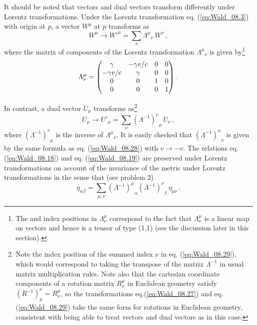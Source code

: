 It should be noted that vectors and dual vectors transform differently under Lorentz transformations. Under the Lorentz transformation eq. (\ref{eq:Wald_08.3}) with origin at $p$, a vector $W^\mu$ at $p$ transforms as 
\begin{equation}\label{eq:Wald_08.27}
W^\mu \longrightarrow {W'}^\mu = \sum_\nu {\Lambda^\mu}_\nu \, W^\nu \,,
\end{equation}
where the matrix of components of the Lorentz transformation ${\Lambda^\mu}_\nu$ is given by\footnote{The  and  index positions in $\Lambda^\mu_\nu$ correspond to the fact that $\Lambda^\mu_\nu$ is a linear map on vectors and hence is a tensor of type (1,1) (see the discussion later in this section).} 
\begin{equation}\label{eq:Wald_08.28}
\Lambda^\mu_\nu = \mqty(  \gamma     & -\gamma v/c & 0 & 0 \\
                         -\gamma v/c &  \gamma     & 0 & 0 \\
                             0       &       0     & 1 & 0 \\
                             0       &       0     & 0 & 1 ) \;.
\end{equation}

In contrast, a dual vector $U_\mu$ transforms as\footnote{Note the index position of the summed index $\nu$ in eq. (\ref{eq:Wald_08.29}), which would correspond to taking the transpose of the matrix $\Lambda^{-1}$ in usual matrix multiplication rules. Note also that the cartesian coordinate components of a rotation matrix $R^\mu_\nu$ in Euclidean geometry satisfy 
$(R^{-1})^\nu_\mu = R^\mu_\nu$, so the transformations eq.(\ref{eq:Wald_08.27}) and eq.(\ref{eq:Wald_08.29}) take the same form for rotations in Euclidean geometry, consistent with being able to treat vectors and dual vectors as  in this case.}
\begin{equation}\label{eq:Wald_08.29}
U_\mu \longrightarrow {U'}_\mu = \sum_\nu {(\Lambda^{-1})^\nu}_\mu \, U_\nu \,,
\end{equation}
where ${(\Lambda^{-1})^\nu}_\mu$ is the inverse of ${\Lambda^\mu}_\nu$. It is easily checked that ${(\Lambda^{-1})^\mu}_\nu$ is given by the same formula as eq. (\ref{eq:Wald_08.28}) with $v \rightarrow - v$. The relations eq. (\ref{eq:Wald_08.18}) and eq. (\ref{eq:Wald_08.19}) are preserved under Lorentz transformations on account of the invariance of the metric under Lorentz transformations in the sense that (see problem 2)
\begin{equation}\label{eq:Wald_08.30}
\eta_{\alpha\beta} = \sum_{\mu,\nu} {(\Lambda^{-1})^\mu}_\alpha {(\Lambda^{-1})^\nu}_\beta \, \eta_{\mu\nu} \,.
\end{equation}

